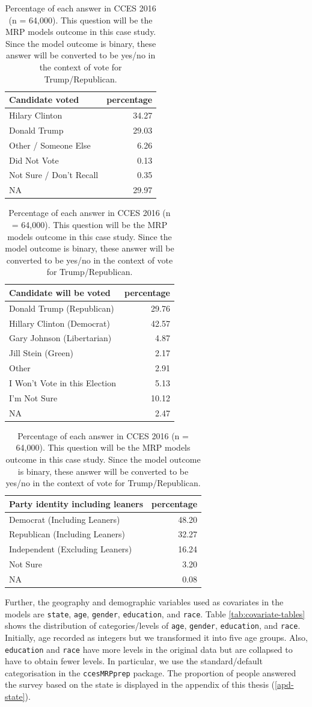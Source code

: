 \documentclass{monashthesis}
\begin{document}
\begin{table}
\caption{\label{tab:outcome-table}Percentage of each answer in CCES 2016 (n = 64,000). This question will be the MRP models outcome in this case study. Since the model outcome is binary, these answer will be converted to be yes/no in the context of vote for Trump/Republican.}

\centering
\begin{tabular}[t]{lr}
\toprule
Candidate voted & percentage\\
\midrule
Hilary Clinton & 34.27\\
Donald Trump & 29.03\\
Other / Someone Else & 6.26\\
Did Not Vote & 0.13\\
Not Sure / Don't Recall & 0.35\\
\addlinespace
NA & 29.97\\
\bottomrule
\end{tabular}
\centering
\begin{tabular}[t]{lr}
\toprule
Candidate will be voted & percentage\\
\midrule
Donald Trump (Republican) & 29.76\\
Hillary Clinton (Democrat) & 42.57\\
Gary Johnson (Libertarian) & 4.87\\
Jill Stein (Green) & 2.17\\
Other & 2.91\\
\addlinespace
I Won't Vote in this Election & 5.13\\
I'm Not Sure & 10.12\\
NA & 2.47\\
\bottomrule
\end{tabular}
\centering
\begin{tabular}[t]{lr}
\toprule
Party identity including leaners & percentage\\
\midrule
Democrat (Including Leaners) & 48.20\\
Republican (Including Leaners) & 32.27\\
Independent (Excluding Leaners) & 16.24\\
Not Sure & 3.20\\
NA & 0.08\\
\bottomrule
\end{tabular}
\end{table}

Further, the geography and demographic variables used as covariates in the models are \texttt{state}, \texttt{age}, \texttt{gender}, \texttt{education}, and \texttt{race}. Table \ref{tab:covariate-tables} shows the distribution of categories/levels of \texttt{age}, \texttt{gender}, \texttt{education}, and \texttt{race}. Initially, age recorded as integers but we transformed it into five age groups. Also, \texttt{education} and \texttt{race} have more levels in the original data but are collapsed to have to obtain fewer levels. In particular, we use the standard/default categorisation in the \texttt{ccesMRPprep} package. The proportion of people answered the survey based on the state is displayed in the appendix of this thesis (\ref{apd-state}).
\end{document}
